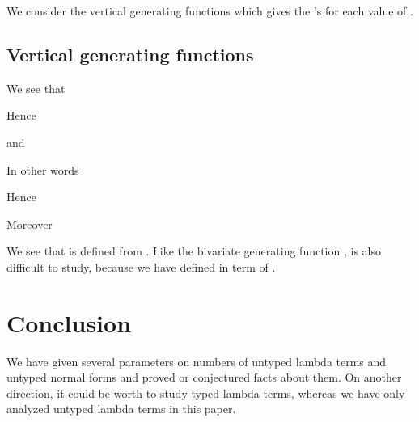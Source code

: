 \documentclass[preprint,authoryear]{elsarticle}
\begin{document}
We consider the vertical generating functions which gives the 's for each value
of .










\subsection*{Vertical generating functions}
\label{sec:vert-gener-funct}


We see that 


Hence

and

In other words

Hence 

Moreover


We see that  is defined from .  Like the
bivariate generating function ,   is also difficult to
study, because we have  defined in term of 
.

\section{Conclusion}
\label{sec:conclusion}

We have given several parameters on numbers of untyped lambda terms and untyped normal
forms and proved or conjectured facts about them.  On another direction, it could be worth
to study typed lambda terms, whereas we have only analyzed untyped lambda terms in this
paper.

\nocite{bruijn58:_asymp_method_analy}
\end{document}
